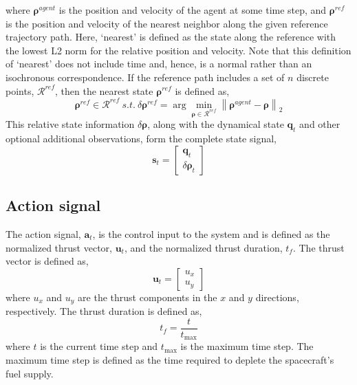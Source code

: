 \documentclass[conference]{IEEEtran}
\begin{document}
where \(\boldsymbol{\rho}^{agent}\) is the position and velocity of the agent at some time step, and \(\boldsymbol{\rho}^{ref}\) is the position and velocity of the nearest neighbor along the given reference trajectory path. Here, `nearest' is defined as the state along the reference with the lowest L2 norm for the relative position and velocity. Note that this definition of `nearest' does not include time and, hence, is a normal rather than an isochronous correspondence. If the reference path includes a set of \(n\) discrete points, \(\mathcal{R}^{ref}\), then the nearest state \(\boldsymbol{\rho}^{ref}\) is defined as,
\[
    \boldsymbol{\rho}^{ref} \in \mathcal{R}^{ref} ~s.t.~ \delta \boldsymbol{\rho}^{ref} = \arg\min_{\boldsymbol{\rho} \in \mathcal{R}^{ref}} \left\| \boldsymbol{\rho}^{agent} - \boldsymbol{\rho} \right\|_2
\]
This relative state information \(\delta \boldsymbol{\rho}\), along with the dynamical state \(\boldsymbol{q}_t\) and other optional additional observations, form the complete state signal,
\begin{equation}
    \boldsymbol{s}_t = \begin{bmatrix}
        \boldsymbol{q}_t \\
        \delta \boldsymbol{\rho}_t
    \end{bmatrix}
\end{equation}

\subsection{Action signal}
The action signal, \(\boldsymbol{a}_t\), is the control input to the system and is defined as the normalized thrust vector, \(\boldsymbol{u}_t\), and the normalized thrust duration, \(t_f\). The thrust vector is defined as,
\begin{equation}
    \boldsymbol{u}_t = \begin{bmatrix}
        u_x \\
        u_y
    \end{bmatrix}
\end{equation}  
where \(u_x\) and \(u_y\) are the thrust components in the \(x\) and \(y\) directions, respectively. The thrust duration is defined as,
\begin{equation}
    t_f = \frac{t}{t_{\max}}
\end{equation}
where \(t\) is the current time step and \(t_{\max}\) is the maximum time step. The maximum time step is defined as the time required to deplete the spacecraft's fuel supply.
\end{document}
